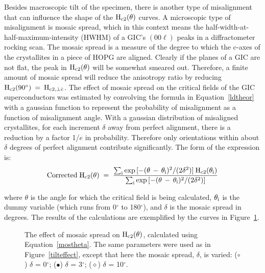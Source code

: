 	Besides macroscopic tilt of the specimen, there  is another type of
misalignment that  can  influence the shape   of the  $\rm  H_{c2}(\theta)$
curves.  A microscopic type of misalignment is mosaic spread, which in this
context means the  half-width-at-half-maximum-intensity (HWHM) of   a GIC's
$(00\ell)$ peaks in a diffractometer rocking scan.   The mosaic spread is a
measure of the degree to which the c-axes of the crystallites in a piece of
HOPG are aligned.  Clearly if the planes of a GIC are not flat, the peak in
$\rm H_{c2}(\theta)$ will be somewhat  smeared  out.   Therefore, a  finite
amount of mosaic spread will  reduce the anisotropy  ratio by reducing $\rm
H_{c2}(90^{\circ}) \:  = \: H_{c2,\perp  \hat{c}}$.   The  effect of mosaic
spread  on the critical fields of  the GIC superconductors was estimated by
convolving the  formula in Equation~\ref{ldtheor} with a  gaussian function
to represent the probability of misalignment as  a function of misalignment
angle.  With a  gaussian distribution of  misaligned crystallites, for each
increment $\delta$ away from  perfect alignment, there  is a reduction by a
factor  1/$e$ in probability.  Therefore   only orientations  within  about
$\delta$ degrees of perfect alignment contribute significantly. The form of
the expression is:\\

\begin{equation}
\label{mostheta}
\rm Corrected \; H_{c2}(\theta) \; = \; \frac{\sum_{i} \exp{[-(\theta \, -
\, \theta_i)^2/(2 \delta^2)]} \: H_{c2}(\theta_i)}{\sum_{i} \exp{[-(\theta
\, - \, \theta_i)^2/(2\delta^2)]}}
\end{equation}

\noindent where $\theta$ is the angle for which the critical field is being
calculated,   $\rm  \theta_i$ is  the    dummy  variable (which runs  from
0$^{\circ}$ to 180$^{\circ}$), and $\delta$ is the mosaic spread in degrees.
The  results of the   calculations    are exemplified by   the  curves   in
Figure~\ref{mospread}.

\begin{figure}
\vspace{4.5in}
\caption[Effect of mosaic spread on $\rm H_{c2}(\theta)$.]{The effect of
mosaic    spread      on     $\rm   H_{c2}(\theta)$,     calculated   using
Equation~\ref{mostheta}.    The    same   parameters   were used    as   in
Figure~\ref{tilteffect}, except  that here the  mosaic spread, $\delta$, is
varied:   ($\circ$)  $\delta$ = 0$^{\circ}$;  ($\bullet$)  $\delta$ =
3$^{\circ}$; ($\diamond$) $\delta$ = 10$^{\circ}$.}
\label{mospread}
\end{figure}

